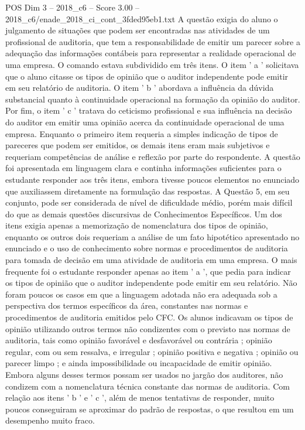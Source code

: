 \begin{textsample}{POS Dim 3 – 2018\_c6 – Score 3.00 – 2018\_c6/enade\_2018\_ci\_cont\_3fded95eb1.txt}
A questão exigia do aluno o julgamento de situações que podem ser encontradas nas atividades de um profissional de auditoria, que tem a responsabilidade de emitir um parecer sobre a adequação das informações contábeis para representar a realidade operacional de uma empresa.
O comando estava subdividido em três itens.
O item ' a ' solicitava que o aluno citasse os tipos de opinião que o auditor independente pode emitir em seu relatório de auditoria.
O item ' b ' abordava a influência da dúvida substancial quanto à continuidade operacional na formação da opinião do auditor.
Por fim, o item ' c ' tratava do ceticismo profissional e sua influência na decisão do auditor em emitir uma opinião acerca da continuidade operacional de uma empresa.
Enquanto o primeiro item requeria a simples indicação de tipos de pareceres que podem ser emitidos, os demais itens eram mais subjetivos e requeriam competências de análise e reflexão por parte do respondente.
A questão foi apresentada em linguagem clara e continha informações suficientes para o estudante responder aos três itens, embora tivesse poucos elementos no enunciado que auxiliassem diretamente na formulação das respostas.
A Questão 5, em seu conjunto, pode ser considerada de nível de dificuldade médio, porém mais difícil do que as demais questões discursivas de Conhecimentos Específicos.
Um dos itens exigia apenas a memorização de nomenclatura dos tipos de opinião, enquanto os outros dois requeriam a análise de um fato hipotético apresentado no enunciado e o uso de conhecimento sobre normas e procedimentos de auditoria para tomada de decisão em uma atividade de auditoria em uma empresa.
O mais frequente foi o estudante responder apenas ao item ' a ', que pedia para indicar os tipos de opinião que o auditor independente pode emitir em seu relatório.
Não foram poucos os casos em que a linguagem adotada não era adequada sob a perspectiva dos termos específicos da área, constantes nas normas e procedimentos de auditoria emitidos pelo CFC.
Os alunos indicavam os tipos de opinião utilizando outros termos não condizentes com o previsto nas normas de auditoria, tais como opinião favorável e desfavorável ou contrária ; opinião regular, com ou sem ressalva, e irregular ; opinião positiva e negativa ; opinião ou parecer limpo ; e ainda impossibilidade ou incapacidade de emitir opinião.
Embora alguns desses termos possam ser usados no jargão dos auditores, não condizem com a nomenclatura técnica constante das normas de auditoria.
Com relação aos itens ' b ' e ' c ', além de menos tentativas de responder, muito poucos conseguiram se aproximar do padrão de respostas, o que resultou em um desempenho muito fraco.

\end{textsample}
